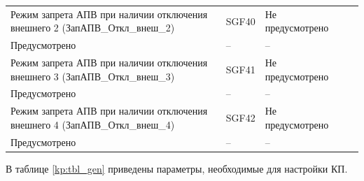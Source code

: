 \begin{longtable}{|>{\centering\arraybackslash}m{5.3cm}|>{\centering\arraybackslash}m{3.3cm}|>{\centering\arraybackslash}m{4.2cm}|>{\centering\arraybackslash}m{1.8cm}|>{\centering\arraybackslash}m{1cm}|}
\hline
\centering Режим запрета АПВ при наличии отключения внешнего 2 (ЗапАПВ\_Откл\_внеш\_2)  & \centering SGF40 & \centering Не предусмотрено \\ Предусмотрено & \centering -- & \centering \arraybackslash -- \\
\hline
\centering Режим запрета АПВ при наличии отключения внешнего 3 (ЗапАПВ\_Откл\_внеш\_3)  & \centering SGF41 & \centering Не предусмотрено \\ Предусмотрено & \centering -- & \centering \arraybackslash -- \\
\hline
\centering Режим запрета АПВ при наличии отключения внешнего 4 (ЗапАПВ\_Откл\_внеш\_4)  & \centering SGF42 & \centering Не предусмотрено \\ Предусмотрено & \centering -- & \centering \arraybackslash -- \\
\hline
\end{longtable}
\normalsize


\par
В таблице \ref{kp:tbl_gen} приведены параметры, необходимые для настройки КП. 

